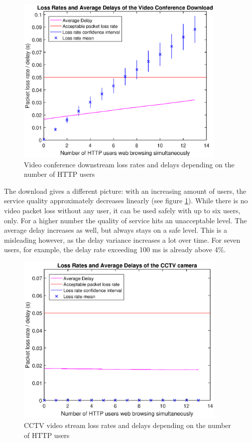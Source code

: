 \documentclass[a4paper,10pt]{book}\usepackage{graphicx}
\begin{document}
\begin{figure}[!ht]
  \begin{center}
    \includegraphics[width=0.9\textwidth]{on_loss_conf_download.eps}
    \caption{Video conference downstream loss rates and delays depending on the number of HTTP users}
    \label{fig:onLossConfDownload}
  \end{center}
\end{figure}

The download gives a different picture: with an increasing amount of users, the service quality approximately decreases linearly (see figure \ref{fig:onLossConfDownload}). While there is no video packet loss without any user, it can be used safely with up to six users, only. For a higher number the quality of service hits an unacceptable level. The average delay increases as well, but always stays on a safe level. This is a misleading however, as the delay variance increases a lot over time. For seven users, for example, the delay rate exceeding 100 ms is already above 4\%.

\begin{figure}[!ht]
  \begin{center}
    \includegraphics[width=0.9\textwidth]{on_loss_cctv.eps}
    \caption{CCTV video stream loss rates and delays depending on the number of HTTP users}
    \label{fig:onLossCctv}
    \end{center}
\end{figure}
\end{document}
